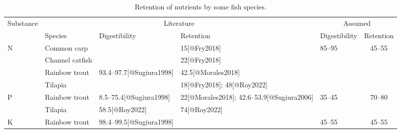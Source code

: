 \begin{table}
\centering
  \begin{threeparttable}
  
  \caption{Retention of nutrients by some fish species.}
  \label{tab:retention}
  
    \begin{tabularx}{\textwidth}{XlXXXc}
    
    \toprule
    
    \multirow{2}{*}{Substance}
    & \multicolumn{3}{c}{Literature}
    & \multicolumn{2}{c}{Assumed}
    \\
    
    \cmidrule(lr){2-4} \cmidrule(lr){5-6}
    
    
    & Species
    & Digestibility
    & Retention
    & Digestibility
    & Retention
    \\
    
    \midrule
    
    N
    & Common carp
    & 
    & \SI{15}{\p}[@Fry2018]
    & \multirow{4}{*}{\SIrange{85}{95}{\p}}
    & \multirow{4}{*}{\SIrange{45}{55}{\p}}
    \\
    
    
    & Channel catfish
    &
    & \SI{22}{\p}[@Fry2018]
    &
    &
    \\
    
    
    & Rainbow trout
    & \SIrange{93.4}{97.7}{\p}[@Sugiura1998]
    & \SI{42.5}{\p}[@Morales2018]
    &
    &
    \\
    
    
    & Tilapia
    &
    & \SI{18}{\p}[@Fry2018]; \SI{48}{\p}[@Roy2022]
    &
    &
    \\
    
    \addlinespace
    
    P
    & Rainbow trout
    & \SIrange{8.5}{75.4}{\p}[@Sugiura1998]
    & \SI{22}{\p}[@Morales2018]; \SIrange{42.6}{53.9}{\p}[@Sugiura2006]
    & \multirow{2}{*}{\SIrange{35}{45}{\p}}
    & \multirow{2}{*}{\SIrange{70}{80}{\p}}
    \\
  
  
    & Tilapia
    & \SI{58.5}{\p}[@Roy2022]
    & \SI{74}{\p}[@Roy2022]
    & 
    &
    \\
    
    \addlinespace
    
    K
    & Rainbow trout
    & \SIrange{98.4}{99.5}{\p}[@Sugiura1998]
    & 
    & \multirow{2}{*}{\SIrange{45}{55}{\p}}
    & \multirow{2}{*}{\SIrange{45}{55}{\p}}
    \\
    

\end{tabularx}
\end{threeparttable}
\end{table}

